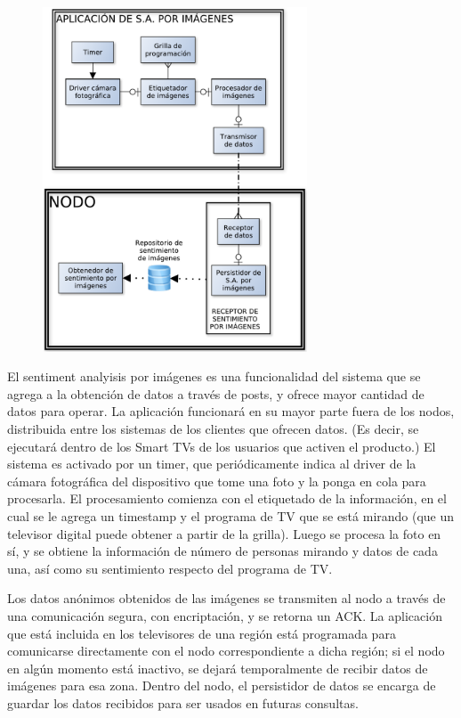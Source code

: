 \begin{figure}[H]
\centering
\includegraphics[width=0.7\textwidth]{graph/smarttv.pdf}
\end{figure}

El sentiment analyisis por imágenes es una funcionalidad del sistema que se agrega a la obtención de datos a través de posts, y ofrece mayor cantidad de datos para operar. La aplicación funcionará en su mayor parte fuera de los nodos, distribuida entre los sistemas de los clientes que ofrecen datos. (Es decir, se ejecutará dentro de los Smart TVs de los usuarios que activen el producto.) El sistema es activado por un timer, que periódicamente indica al driver de la cámara fotográfica del dispositivo que tome una foto y la ponga en cola para procesarla. El procesamiento comienza con el etiquetado de la información, en el cual se le agrega un timestamp y el programa de TV que se está mirando (que un televisor digital puede obtener a partir de la grilla). Luego se procesa la foto en sí, y se obtiene la información de número de personas mirando y datos de cada una, así como su sentimiento respecto del programa de TV.

Los datos anónimos obtenidos de las imágenes se transmiten al nodo a través de una comunicación segura, con encriptación, y se retorna un ACK. La aplicación que está incluida en los televisores de una región está programada para comunicarse directamente con el nodo correspondiente a dicha región; si el nodo en algún momento está inactivo, se dejará temporalmente de recibir datos de imágenes para esa zona. Dentro del nodo, el persistidor de datos se encarga de guardar los datos recibidos para ser usados en futuras consultas.